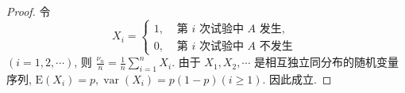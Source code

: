 \begin{proof}令
$$
X_i= \begin{cases}1, & \text { 第 } i \text { 次试验中 } A \text { 发生, } \\ 0, & \text { 第 } i \text { 次试验中 } A \text { 不发生 }\end{cases}
$$
$(i=1,2, \cdots)$, 则 $\frac{\nu_n}{n}=\frac{1}{n} \sum_{i=1}^n X_i$. 由于 $X_1, X_2, \cdots$ 是相互独立同分布的随机变量序列, $\mathrm{E}\left(X_i\right)=p, \operatorname{var}\left(X_i\right)=p(1-p)(i \geqslant 1)$. 因此成立.
\end{proof}






